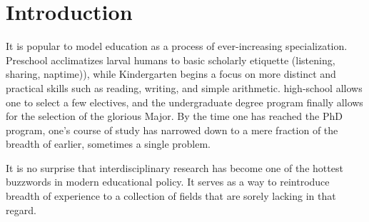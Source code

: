 \section{Introduction}
\label{sec:-intro}

It is popular to model education as a process of ever-increasing 
specialization.  Preschool acclimatizes larval humans to basic 
scholarly etiquette (listening, sharing, naptime)), while Kindergarten 
begins a focus on more distinct and practical skills such as reading, 
writing, and simple arithmetic.  high-school allows one to select a few 
electives, and the undergraduate degree program finally allows for the 
selection of the glorious Major.  By the time one has reached the PhD 
program, one's course of study has narrowed down to a mere fraction of 
the breadth of earlier, sometimes a single problem.

It is no surprise that interdisciplinary research has become one of the 
hottest buzzwords in modern educational policy.  It serves as a way to 
reintroduce breadth of experience to a collection of fields that are 
sorely lacking in that regard.  




